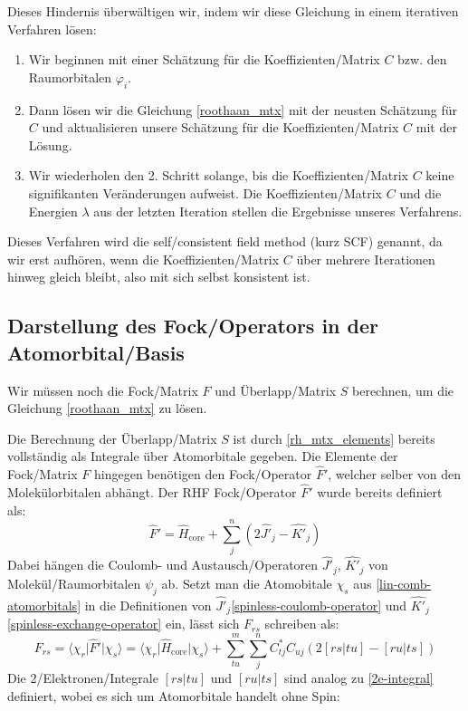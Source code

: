 Dieses Hindernis überwältigen wir,
indem wir diese Gleichung in einem iterativen Verfahren lösen:
\begin{enumerate}
    \item Wir beginnen mit einer Schätzung
    für die Koeffizienten\-/Matrix $C$ bzw. den Raumorbitalen $\varphi_i$.
    \item Dann lösen wir die Gleichung \cref{roothaan_mtx} mit der neusten Schätzung
    für $C$ und aktualisieren unsere Schätzung
    für die Koeffizienten\-/Matrix $C$ mit der Lösung.
    \item Wir wiederholen den 2. Schritt solange, bis die Koeffizienten\-/Matrix $C$
    keine signifikanten Veränderungen aufweist. Die Koeffizienten\-/Matrix $C$
    und die Energien $\lambda$ aus der letzten Iteration stellen die Ergebnisse
    unseres Verfahrens. 
\end{enumerate}

Dieses Verfahren wird die self\-/consistent field method (kurz SCF) genannt,
da wir erst aufhören, wenn die Koeffizienten\-/Matrix $C$
über mehrere Iterationen hinweg gleich bleibt, also mit sich selbst konsistent ist.\\



\cite[9.3]{atkins_friedman_2011}
\cite[Figure 9.1]{atkins_friedman_2011}
\subsection{Darstellung des Fock\-/Operators in der Atomorbital\-/Basis}\label{F_S_mtx_calc}

Wir müssen noch die Fock\-/Matrix $F$ und Überlapp\-/Matrix $S$ berechnen,
um die Gleichung \cref{roothaan_mtx} zu lösen.

Die Berechnung der Überlapp\-/Matrix $S$ ist durch \cref{rh_mtx_elements} bereits vollständig
als Integrale über Atomorbitale gegeben.
Die Elemente der Fock\-/Matrix $F$ hingegen benötigen den Fock\-/Operator $\hat{F}'$,
welcher selber von den Molekülorbitalen abhängt.
Der RHF Fock\-/Operator $\hat{F}'$ wurde bereits definiert als:
\begin{equation}
    \hat{F}' = \hat{H}_{\text{core}} + \sum_j^{n}
    \left( 2\hat{J'}_j - \hat{K'}_j \right)
\end{equation}
Dabei hängen die Coulomb- und Austausch\-/Operatoren $\hat{J'}_j$, $\hat{K'}_j$
von Molekül\-/Raumorbitalen $\psi_j$ ab.
Setzt man die Atomobitale $\chi_s$ aus \cref{lin-comb-atomorbitals} in
die Definitionen von $\hat{J'}_j$\cref{spinless-coulomb-operator} und
$\hat{K'}_j$ \cref{spinless-exchange-operator} ein, lässt sich $F_{r s}$ schreiben als:
\begin{equation}\label{fock-matrix-element}
    F_{rs} = \langle \chi_r \vert \hat{F}' \vert \chi_s \rangle
    = \langle \chi_r \vert \hat{H}_{\text{core}} \vert \chi_s \rangle
    + \sum_{tu}^m \sum_j^{n} C_{tj}^*C_{uj}\left( 2[rs\vert tu] - [ru\vert ts] \right)
\end{equation}
Die 2\-/Elektronen\-/Integrale $[rs\vert tu]$ und $[ru\vert ts]$
sind analog zu \cref{2e-integral} definiert, wobei es sich um Atomorbitale handelt ohne Spin:

